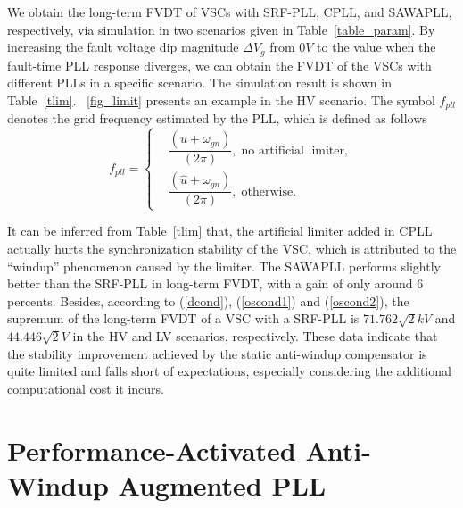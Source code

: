 \documentclass[10pt,final,journal,twoside]{IEEEtran}
\begin{document}
We obtain the long-term FVDT of VSCs with SRF-PLL, CPLL, and SAWAPLL, respectively, via simulation in two scenarios given in Table~\ref{table_param}. By increasing the fault voltage dip magnitude
$\Delta V_g$ from $0V$ to the value when the fault-time PLL response diverges, we can obtain the FVDT of the VSCs with different PLLs in a specific scenario. The simulation result is shown in Table~\ref{tlim}.
\figurename~\ref{fig_limit} presents an example in the HV scenario. The symbol $f_{pll}$ denotes the grid frequency estimated by the PLL, which is defined as follows
\[f_{pll}=\left\{\begin{aligned}
    &\dfrac{\left(u+\omega_{gn}\right)}{\left(2\pi\right)},\;\textrm{no artificial limiter},\\
    &\dfrac{\left(\hat{u}+\omega_{gn}\right)}{\left(2\pi\right)},\;\textrm{otherwise}.
\end{aligned}\right.\]
\FloatBarrier
\begin{table}[H]
\caption{Long-term FVDT of VSCs with SRF-PLL, CPLL, and SAWAPLL}
\label{tlim}
\centering
{}
\end{table}
It can be inferred from Table~\ref{tlim} that, the artificial limiter added in CPLL actually hurts the synchronization stability of the VSC, which is attributed
to the ``windup'' phenomenon caused by the limiter. The SAWAPLL performs slightly better than the SRF-PLL in long-term FVDT, with a gain of
only around 6 percents. Besides, according to (\ref{dcond}), (\ref{oscond1}) and (\ref{oscond2}), the supremum of the long-term FVDT of a VSC with a SRF-PLL is
$71.762\sqrt{2}kV$ and $44.446\sqrt{2}V$ in the HV and LV scenarios, respectively. These data indicate that the stability improvement achieved by the static
anti-windup compensator is quite limited and falls short of expectations, especially considering the additional computational cost it incurs.

\section{Performance-Activated Anti-Windup Augmented PLL}\label{sec:paawapll}
\end{document}
